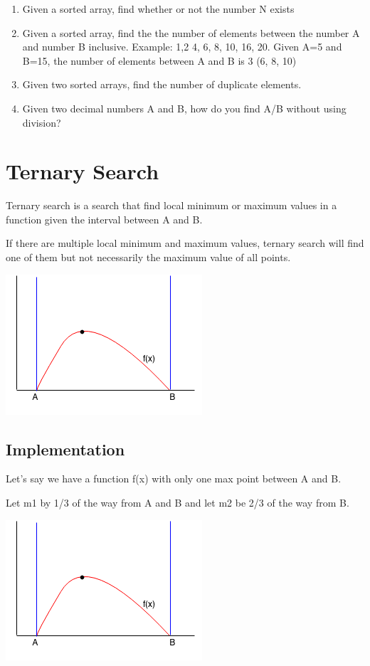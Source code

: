 \documentclass[11pt,oneside]{book}
\makeatletter
\def\maxwidth#1{\ifdim\Gin@nat@width>#1 #1\else\Gin@nat@width\fi}
\makeatother
\begin{document}
\begin{enumerate}
\item Given a sorted array, find whether or not the number N exists
\item Given a sorted array, find the the number of elements between the number A and number B inclusive.
Example: 1,2 4, 6, 8, 10, 16, 20. Given A=5 and B=15, the number of elements between A and B is 3 (6, 8, 10)
\item Given two sorted arrays, find the number of duplicate elements.
\item Given two decimal numbers A and B, how do you find A/B without using division?
\end{enumerate}

        \section{ Ternary Search }
        

Ternary search is a search that find local minimum or maximum values in a function given the interval between A and B.

If there are multiple local minimum and maximum values, ternary search will find one of them but not necessarily the maximum value of all points.

\includegraphics[width=\maxwidth{\textwidth}]{ternarysearch.png}

\subsection{Implementation}

Let's say we have a function f(x) with only one max point between A and B.

Let m1 by 1/3 of the way from A and B and let m2 be 2/3 of the way from B.

\includegraphics[width=\maxwidth{\textwidth}]{ternarysearch.png}
\end{document}
